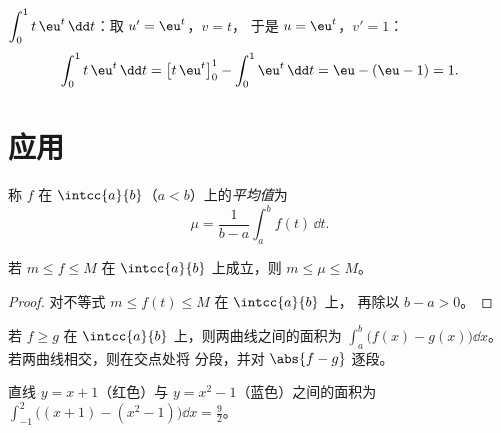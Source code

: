 \begin{example}\label{ex:g12:integ:ibp}
$\displaystyle\int_0^1 t\,\eu^{t}\,\dd t$：取 $u' = \eu^t$，$v = t$，
于是 $u = \eu^t$，$v' = 1$：
\[
\int_0^1 t\,\eu^t\,\dd t = \bigl[t\,\eu^t\bigr]_0^1 - \int_0^1 \eu^t\,\dd t
= \eu - (\eu - 1) = 1 .
\]
\end{example}

\section{应用}

\begin{definition}[平均值]\label{def:g12:integ:mean}
称 $f$ 在
$\intcc{a}{b}$（$a<b$）上的\emph{平均值}为
\[
\mu = \frac{1}{b-a}\int_a^b f(t)\,\dd t .
\]
\end{definition}

\begin{proposition}\label{prop:g12:integ:meanbounds}
若 $m \leq f \leq M$ 在 $\intcc{a}{b}$ 上成立，则 $m \leq \mu \leq M$。
\end{proposition}

\begin{proof}
对不等式 $m \leq f(t) \leq M$ 在 $\intcc{a}{b}$ 上，
再除以 $b - a > 0$。
\end{proof}

\begin{method}[两条曲线之间的面积]\label{met:g12:integ:areabetween}
若 $f \geq g$ 在 $\intcc{a}{b}$ 上，则两曲线之间的面积为
$\int_a^b \bigl(f(x) - g(x)\bigr)\dd x$。若两曲线相交，则在交点处将
分段，并对 $\abs{f - g}$ 逐段。
\end{method}

\begin{omfigure}

{\small 直线 $y = x + 1$（红色）与
$y = x^2 - 1$（蓝色）之间的面积为 $\int_{-1}^{2}
\bigl((x+1) - (x^2-1)\bigr)\dd x = \frac92$。}
\end{omfigure}

